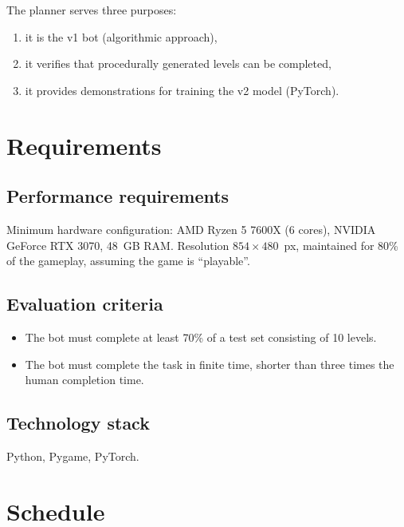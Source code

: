 \documentclass[11pt,a4paper]{article}
\begin{document}
The planner serves three purposes:
\begin{enumerate}
  \item it is the v1 bot (algorithmic approach),
  \item it verifies that procedurally generated levels can be completed,
  \item it provides demonstrations for training the v2 model (PyTorch).
\end{enumerate}

\section{Requirements}

\subsection{Performance requirements}

Minimum hardware configuration: AMD Ryzen 5 7600X (6 cores), NVIDIA GeForce RTX 3070,
48~GB RAM. Resolution $854\times480$~px, maintained for 80\% of the gameplay, assuming the
game is ``playable''.

\subsection{Evaluation criteria}

\begin{itemize}
  \item The bot must complete at least 70\% of a test set consisting of 10 levels.
  \item The bot must complete the task in finite time, shorter than three times the
        human completion time.
\end{itemize}

\subsection{Technology stack}

Python, Pygame, PyTorch.

\section{Schedule}
\end{document}
